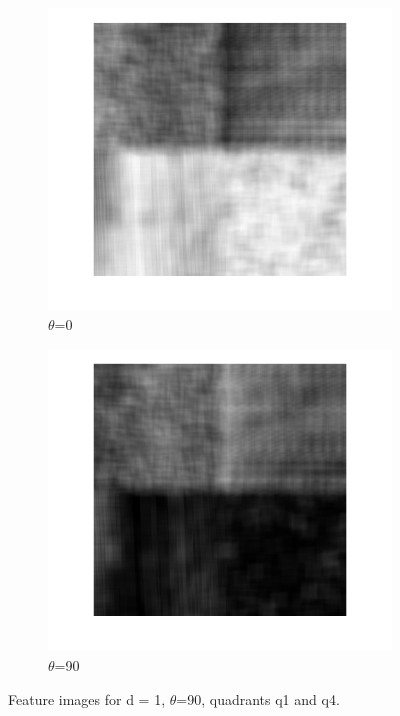 \documentclass[a4paper, article, oneside, UKenglish]{memoir}
\newcommand{\0}{\mathbf{0}}
\newcommand{\1}{\mathbf{1}}
\begin{document}
\begin{figure}[h]
  \centering
  \begin{subfigure}[b]{0.45\linewidth}
    \includegraphics[width=\linewidth]{./images/fi3.png}
    \caption{$\theta$=0}
  \end{subfigure}
  \begin{subfigure}[b]{0.45\linewidth}
    \includegraphics[width=\linewidth]{./images/fi4.png}
    \caption{$\theta$=90}
  \end{subfigure}
  \caption{Feature images for d = 1, $\theta$=90, quadrants q1 and q4.}
  \label{fig:fi90}
\end{figure}
\end{document}
